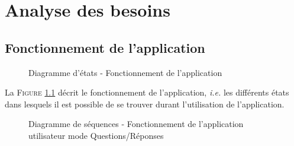 \chapter{Analyse des besoins}

\section{Fonctionnement de l'application}


 \begin{figure}[!ht]
 \begin{center}
  \caption{Diagramme d'états - Fonctionnement de l'application}
  \label{etattrans}
 \end{center}
 \end{figure}


 La \textsc{Figure} \ref{etattrans} décrit le fonctionnement de l'application, \textit{i.e.} les différents états dans lesquels il est possible de se trouver durant l'utilisation de l'application.


 \begin{figure}[!ht]
 \begin{center}
  \caption{Diagramme de séquences - Fonctionnement de l’application utilisateur mode Questions/Réponses}
  \label{sequence}
 \end{center}
 \end{figure}

